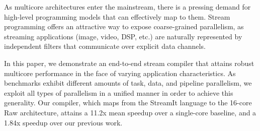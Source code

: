 As multicore architectures enter the mainstream, there is a pressing
demand for high-level programming models that can effectively map to
them.  Stream programming offers an attractive way to expose
coarse-grained parallelism, as streaming applications (image, video,
DSP, etc.) are naturally represented by independent filters that
communicate over explicit data channels.

In this paper, we demonstrate an end-to-end stream compiler that
attains robust multicore performance in the face of varying
application characteristics.  As benchmarks exhibit different amounts
of task, data, and pipeline parallelism, we exploit all types of
parallelism in a unified manner in order to achieve this generality.
Our compiler, which maps from the StreamIt language to the 16-core Raw
architecture, attains a 11.2x mean speedup over a single-core
baseline, and a 1.84x speedup over our previous work.






